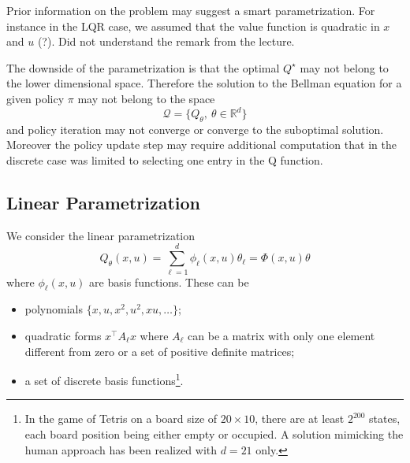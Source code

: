 Prior information on the problem may suggest a smart parametrization. For instance in the LQR case, we assumed that the value function is quadratic in $x$ and $u$ (?). Did not understand the remark from the lecture.

The downside of the parametrization is that the optimal $Q^\star$  may not belong to the lower dimensional space. Therefore the solution to the Bellman equation for a given policy $\pi$ may not belong to the space
\begin{equation*}
  \mathcal{Q} = \{Q_\theta,\ \theta\in\mathbb{R}^d\}
\end{equation*}
and policy iteration may not converge or converge to the suboptimal solution. Moreover the policy update step may require additional computation that in the discrete case was limited to selecting one entry in the Q function.

\subsection{Linear Parametrization}
\label{sec:RL-linear-parametrization}

We consider the linear parametrization
\begin{equation}
  \label{eq:Q-linear-parametrization}
  Q_\theta(x,u) = \sum_{\ell=1}^d \phi_\ell(x,u)\theta_\ell = \Phi(x,u)\theta
\end{equation}
where $\phi_\ell(x,u)$ are basis functions. These can be
\begin{itemize}
\item polynomials $\{x, u, x^2, u^2, xu,\ldots\}$;
\item quadratic forms $x^\top A_\ell x$ where $A_\ell$ can be a matrix with only one element different from zero or a set of positive definite matrices;
\item a set of discrete basis functions\footnote{In the game of Tetris on a board size of $20\times 10$, there are at least $2^{200}$ states, each board position being either empty or occupied. A solution mimicking the human approach has been realized with $d=21$ only.}.
\end{itemize}

